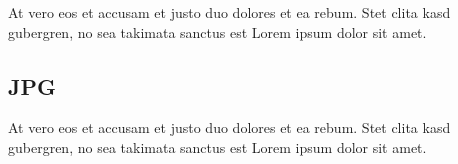 \documentclass[11pt]{scrartcl}
\begin{document}
\begin{figure}[htbp]
   \centering
   \setlength{\fboxsep}{5pt}
   \setlength{\fboxrule}{2pt}
   \label{fig:Abb-3-28-png}
\end{figure}

At vero eos et accusam et justo duo dolores et ea rebum. Stet clita kasd gubergren, no sea takimata sanctus est Lorem ipsum dolor sit amet.

\newpage

\subsection{JPG}
At vero eos et accusam et justo duo dolores et ea rebum. Stet clita kasd gubergren, no sea takimata sanctus est Lorem ipsum dolor sit amet.

\begin{figure}[htbp]
   \centering
   \setlength{\fboxsep}{5pt}
   \setlength{\fboxrule}{2pt}
   \label{fig:Abb-3-28-jpg}
\end{figure}
\end{document}
